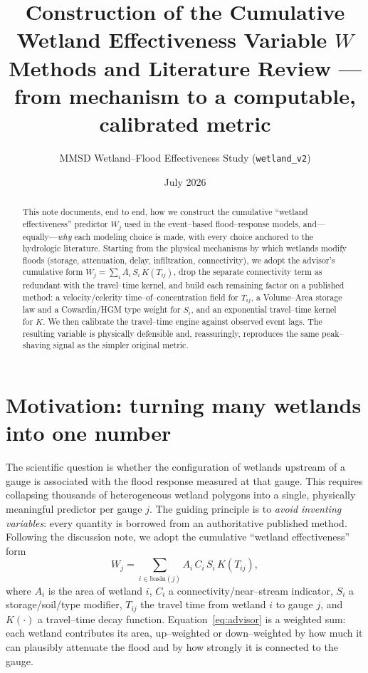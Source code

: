 \documentclass[11pt]{article}
\title{\textbf{Construction of the Cumulative Wetland Effectiveness Variable $W$}\\[3pt]
\large Methods and Literature Review --- from mechanism to a computable, calibrated metric}
\author{MMSD Wetland--Flood Effectiveness Study \quad(\texttt{wetland\_v2})}
\date{July 2026}
\newcommand{\Wj}{W_{j}}
\newcommand{\Ti}{T_{ij}}
\begin{document}
\maketitle
\vspace{-1.1em}
\begin{abstract}\noindent\small
This note documents, end to end, how we construct the cumulative ``wetland effectiveness''
predictor $\Wj$ used in the event--based flood--response models, and---equally---\emph{why} each
modeling choice is made, with every choice anchored to the hydrologic literature. Starting from
the physical mechanisms by which wetlands modify floods (storage, attenuation, delay,
infiltration, connectivity), we adopt the advisor's cumulative form
$\Wj=\sum_i A_i\,S_i\,K(\Ti)$, drop the separate connectivity term as redundant with the
travel--time kernel, and build each remaining factor on a published method: a velocity/celerity
time--of--concentration field for $\Ti$, a Volume--Area storage law and a Cowardin/HGM type
weight for $S_i$, and an exponential travel--time kernel for $K$. We then calibrate the
travel--time engine against observed event lags. The resulting variable is physically defensible
and, reassuringly, reproduces the same peak--shaving signal as the simpler original metric.
\normalsize\end{abstract}

\section{Motivation: turning many wetlands into one number}
The scientific question is whether the configuration of wetlands upstream of a gauge is
associated with the flood response measured at that gauge. This requires collapsing thousands of
heterogeneous wetland polygons into a single, physically meaningful predictor per gauge $j$. The
guiding principle \citep{workflow} is to \emph{avoid inventing variables}: every quantity is
borrowed from an authoritative published method. Following the discussion note, we adopt the
cumulative ``wetland effectiveness'' form
\begin{equation}
\Wj=\sum_{i\in\text{basin}(j)} A_i\,C_i\,S_i\,K(\Ti),
\label{eq:advisor}
\end{equation}
where $A_i$ is the area of wetland $i$, $C_i$ a connectivity/near--stream indicator, $S_i$ a
storage/soil/type modifier, $\Ti$ the travel time from wetland $i$ to gauge $j$, and $K(\cdot)$ a
travel--time decay function. Equation~\eqref{eq:advisor} is a weighted sum: each wetland
contributes its area, up--weighted or down--weighted by how much it can plausibly attenuate the
flood and by how strongly it is connected to the gauge.
\end{document}
